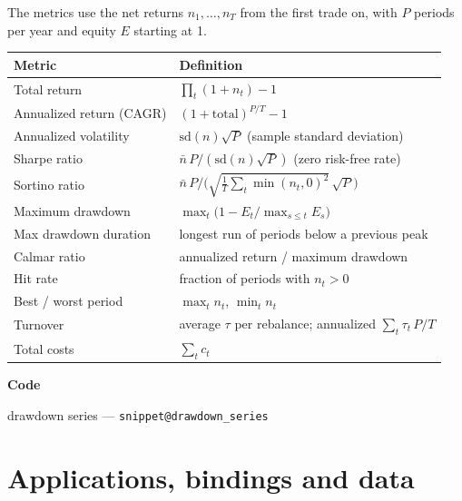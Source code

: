 \documentclass[11pt,a4paper]{article}
\makeatletter
\newcommand{\snippetsource}[1]{\csname snippet@#1\endcsname}
\newcommand{\snippet}[3]{%
  }
\newenvironment{codepointers}{%
  \par\smallskip\begingroup\footnotesize\noindent\textcolor{blue!50!black}{\textbf{Code}}\par\nopagebreak
  \begin{list}{}{\setlength{\leftmargin}{1.2em}\setlength{\itemsep}{0pt}\setlength{\parsep}{0pt}\setlength{\topsep}{1pt}}}%
  {\end{list}\endgroup\smallskip}
\newcommand{\codeitem}[2]{\item #2 --- \texttt{\snippetsource{#1}}}
\makeatother
\begin{document}
The metrics use the net returns $n_1,\dots,n_T$ from the first trade on, with $P$ periods
per year and equity $E$ starting at 1.
\begin{center}\small
\begin{tabular}{@{}ll@{}}
\toprule
Metric & Definition \\
\midrule
Total return & $\prod_t(1+n_t)-1$ \\
Annualized return (CAGR) & $(1+\text{total})^{P/T}-1$ \\
Annualized volatility & $\mathrm{sd}(n)\sqrt P$ (sample standard deviation) \\
Sharpe ratio & $\bar n\,P/(\mathrm{sd}(n)\sqrt P)$ (zero risk-free rate) \\
Sortino ratio & $\bar n\,P/\big(\sqrt{\tfrac1T\sum_t\min(n_t,0)^2}\,\sqrt P\big)$ \\
Maximum drawdown & $\max_t\big(1-E_t/\max_{s\le t}E_s\big)$ \\
Max drawdown duration & longest run of periods below a previous peak \\
Calmar ratio & annualized return / maximum drawdown \\
Hit rate & fraction of periods with $n_t>0$ \\
Best / worst period & $\max_tn_t$, $\min_tn_t$ \\
Turnover & average $\tau$ per rebalance; annualized $\sum_t\tau_t\,P/T$ \\
Total costs & $\sum_tc_t$ \\
\bottomrule
\end{tabular}
\end{center}
\snippet{performance}{C++}{Performance metrics}
\begin{codepointers}
  \codeitem{drawdown_series}{drawdown series}
\end{codepointers}

\part{Applications, bindings and data}
\end{document}

